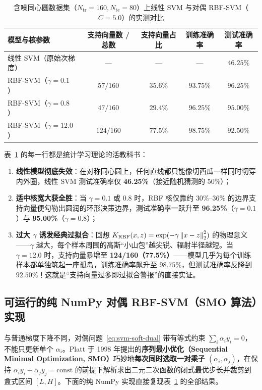 \begin{table}[htbp]
\centering
\caption{含噪同心圆数据集（$N_{\text{tr}}=160, N_{\text{te}}=80$）上线性 SVM 与对偶 RBF-SVM（$C=5.0$）的实测对比}
\label{tab:svm-circles}
\small
\begin{tabular}{@{}lcccc@{}}
\toprule
\textbf{模型与核参数} & \textbf{支持向量数 / 总数} & \textbf{支持向量占比} & \textbf{训练准确率} & \textbf{测试准确率} \\
\midrule
线性 SVM（原始次梯度） & --- & --- & --- & $46.25\%$ \\
RBF-SVM（$\gamma = 0.1$） & $57 / 160$ & $35.6\%$ & $93.75\%$ & $\mathbf{96.25\%}$ \\
RBF-SVM（$\gamma = 0.8$） & $47 / 160$ & $29.4\%$ & $96.25\%$ & $95.00\%$ \\
RBF-SVM（$\gamma = 12.0$） & $124 / 160$ & $77.5\%$ & $98.75\%$ & $92.50\%$ \\
\bottomrule
\end{tabular}
\end{table}

表~\ref{tab:svm-circles} 的每一行都是统计学习理论的活教科书：
\begin{enumerate}
  \item \textbf{线性模型彻底失效}：在对称同心圆上，任何直线都只能像切西瓜一样同时切穿内外圈，线性 SVM 测试准确率仅 \textbf{46.25\%}（接近随机猜测的 50\%）；
  \item \textbf{适中核宽大获全胜}：当 $\gamma = 0.1$ 或 $0.8$ 时，RBF 核仅靠约 $30\%\text{--}36\%$ 的边界支持向量便勾勒出圆润的环形决策边界，测试准确率一跃升至 \textbf{96.25\%}（$\gamma=0.1$）与 \textbf{95.00\%}（$\gamma=0.8$）；
  \item \textbf{过大 $\gamma$ 诱发经典过拟合}：回想 $K_{\mathrm{RBF}}(x, z) = \exp(-\gamma\left\|x-z\right\|_2^2)$ 的物理意义——$\gamma$ 越大，每个样本周围的高斯“小山包”越尖锐、辐射半径越短。当 $\gamma = 12.0$ 时，支持向量暴增至 \textbf{124/160（77.5\%）}——模型几乎为每个训练样本都单独筑起一座孤岛，训练准确率飙升至 $98.75\%$，但测试准确率反降到 $92.50\%$！这就是“支持向量过多即过拟合警报”的直接实证。
\end{enumerate}

\subsection{可运行的纯 NumPy 对偶 RBF-SVM（SMO 算法）实现}

与普通梯度下降不同，对偶问题~\eqref{eq:svm-soft-dual} 带有等式约束 $\sum_i \alpha_i y_i = 0$，不能只更新单个 $\alpha_i$。Platt 于 1998 年提出的\textbf{序列最小优化（Sequential Minimal Optimization, SMO）}巧妙地\textbf{每次同时选取一对乘子 $(\alpha_i, \alpha_j)$}，在保持 $\alpha_i y_i + \alpha_j y_j = \text{const}$ 的前提下解析求出二元二次函数的闭式最优步长并裁剪到盒式区间 $[L, H]$。下面的纯 NumPy 实现直接复现表~\ref{tab:svm-circles} 的全部结果。

